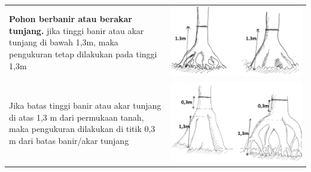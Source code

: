 \documentclass[
]{book}
\begin{document}
\begin{longtable}[]{@{}
  >{\raggedright\arraybackslash}p{}
  >{\raggedright\arraybackslash}p{}@{}}
\textbf{Pohon berbanir atau berakar tunjang.} jika tinggi banir atau akar tunjang di bawah 1,3m, maka pengukuran tetap dilakukan pada tinggi 1,3m & \includegraphics{images/vtb4.jpg} \\
Jika batas tinggi banir atau akar tunjang di atas 1,3 m dari permukaan tanah, maka pengukuran dilakukan di titik 0,3 m dari batas banir/akar tunjang & \includegraphics{images/vtb5.jpg} \\

\end{longtable}
\end{document}
